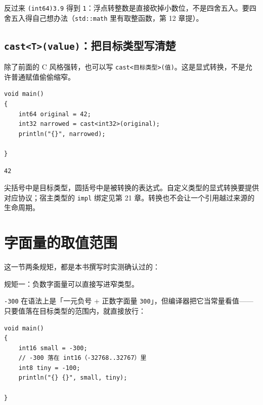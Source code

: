 反过来 \texttt{(\allowbreak{}int64)\allowbreak{}3.\allowbreak{}9} 得到 \texttt{1}：浮点转整数是直接砍掉小数位，不是四舍五入。要四舍五入得自己想办法（\texttt{std:\allowbreak{}:\allowbreak{}math} 里有取整函数，第 12 章提）。

\subsection*{\texttt{cast<\allowbreak{}T>\allowbreak{}(\allowbreak{}value)\allowbreak{}}：把目标类型写清楚}

除了前面的 C 风格强转，也可以写 \texttt{cast<\allowbreak{}目标类型>\allowbreak{}(\allowbreak{}值)\allowbreak{}}。这是显式转换，不是允许普通赋值偷偷缩窄。

\par
\medskip
\begin{lstlisting}[style=chali]
void main()
{
    int64 original = 42;
    int32 narrowed = cast<int32>(original);
    println("{}", narrowed);

}
\end{lstlisting}
\par
\medskip

\par
\medskip
\begin{lstlisting}[style=out]
42
\end{lstlisting}
\par
\medskip

尖括号中是目标类型，圆括号中是被转换的表达式。自定义类型的显式转换要提供对应协议；宿主类型的 \texttt{impl} 绑定见第 21 章。转换也不会让一个引用越过来源的生命周期。

\section{字面量的取值范围}

这一节两条规矩，都是本书撰写时实测确认过的：

规矩一：负数字面量可以直接写进窄类型。

\texttt{-300} 在语法上是「一元负号 + 正数字面量 \texttt{300}」，但编译器把它当常量看值——只要值落在目标类型的范围内，就直接放行：

\par
\medskip
\begin{lstlisting}[style=chali]
void main()
{
    int16 small = -300;
    // -300 落在 int16（-32768..32767）里
    int8 tiny = -100;
    println("{} {}", small, tiny);

}
\end{lstlisting}
\par
\medskip

